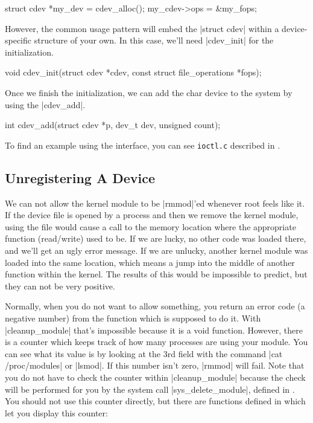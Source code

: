 \documentclass[10pt, oneside]{book}
\begin{document}
\begin{code}
struct cdev *my_dev = cdev_alloc();
my_cdev->ops = &my_fops;
\end{code}

However, the common usage pattern will embed the \cpp|struct cdev| within a device-specific structure of your own.
In this case, we'll need \cpp|cdev_init| for the initialization.

\begin{code}
void cdev_init(struct cdev *cdev, const struct file_operations *fops);
\end{code}

Once we finish the initialization, we can add the char device to the system by using the \cpp|cdev_add|.

\begin{code}
int cdev_add(struct cdev *p, dev_t dev, unsigned count);
\end{code}

To find an example using the interface, you can see \verb|ioctl.c| described in .

\subsection{Unregistering A Device}
\label{sec:unregister_device}
We can not allow the kernel module to be \sh|rmmod|'ed whenever root feels like it.
If the device file is opened by a process and then we remove the kernel module, using the file would cause a call to the memory location where the appropriate function (read/write) used to be.
If we are lucky, no other code was loaded there, and we'll get an ugly error message.
If we are unlucky, another kernel module was loaded into the same location, which means a jump into the middle of another function within the kernel.
The results of this would be impossible to predict, but they can not be very positive.

Normally, when you do not want to allow something, you return an error code (a negative number) from the function which is supposed to do it.
With \cpp|cleanup_module| that's impossible because it is a void function.
However, there is a counter which keeps track of how many processes are using your module.
You can see what its value is by looking at the 3rd field with the command \sh|cat /proc/modules| or \sh|lsmod|.
If this number isn't zero, \sh|rmmod| will fail.
Note that you do not have to check the counter within \cpp|cleanup_module| because the check will be performed for you by the system call \cpp|sys_delete_module|, defined in .
You should not use this counter directly, but there are functions defined in  which let you display this counter:
\end{document}
